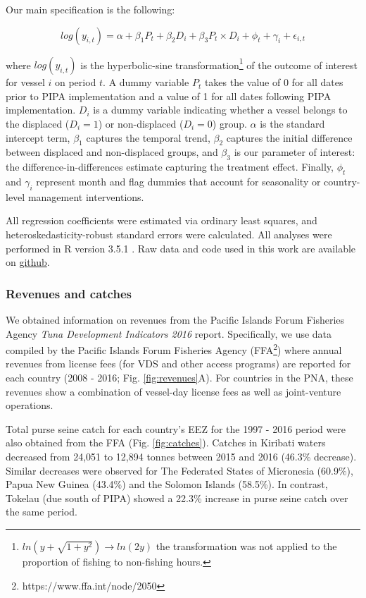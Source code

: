 \documentclass[12pt]{article}
\begin{document}
Our main specification is the following:

$$
log(y_{i,t}) = \alpha + \beta_1 P_t + \beta_2 D_i + \beta_3 P_t \times D_i + \phi_t + \gamma_i + \epsilon_{i,t}
\label{eqn:did}
$$

\noindent where $log(y_{i,t})$ is the hyperbolic-sine transformation\footnote{$ln\left(y + \sqrt{1 + y^2}\right)\rightarrow ln(2y)$ the transformation was not applied to the proportion of fishing to non-fishing hours.} of the outcome of interest for vessel $i$ on period $t$. A dummy variable $P_t$ takes the value of 0 for all dates prior to PIPA implementation and a value of 1 for all dates following PIPA implementation. $D_i$ is a dummy variable indicating whether a vessel belongs to the displaced ($D_i = 1$) or non-displaced ($D_i = 0$) group. $\alpha$ is the standard intercept term, $\beta_1$ captures the temporal trend, $\beta_2$ captures the initial difference between displaced and non-displaced groups, and $\beta_3$ is our parameter of interest: the difference-in-differences estimate capturing the treatment effect. Finally, $\phi_t$ and $\gamma_i$ represent month and flag dummies that account for seasonality or country-level management interventions.

All regression coefficients were estimated via ordinary least squares, and heteroskedasticity-robust standard errors were calculated. All analyses were performed in R version 3.5.1 \cite{rcore_2018}. Raw data and code used in this work are available on \href{https://github.com/jcvdav/MPA_displacement}{github}.

\subsubsection{Revenues and catches}

We obtained information on revenues from the Pacific Islands Forum Fisheries Agency \emph{Tuna Development Indicators 2016} report.  Specifically, we use data compiled by the Pacific Islands Forum Fisheries Agency (FFA\footnote{https://www.ffa.int/node/2050}) where annual revenues from license fees (for VDS and other access programs) are reported for each country (2008 - 2016; Fig. \ref{fig:revenues}A). For countries in the PNA, these revenues show a combination of vessel-day license fees as well as joint-venture operations.

Total purse seine catch for each country's EEZ for the 1997 - 2016 period were also obtained from the FFA (Fig. \ref{fig:catches}). Catches in Kiribati waters decreased from 24,051 to 12,894 tonnes between 2015 and 2016 (46.3\% decrease). Similar decreases were observed for The Federated States of Micronesia (60.9\%), Papua New Guinea (43.4\%) and the Solomon Islands (58.5\%). In contrast, Tokelau (due south of PIPA) showed a 22.3\% increase in purse seine catch over the same period.
\end{document}

